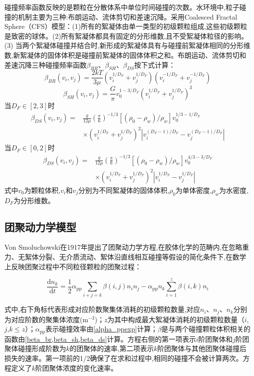 碰撞频率函数反映的是颗粒在分散体系中单位时间碰撞的次数。水环境中,粒子碰撞的机制主要为三种:布朗运动、流体剪切和差速沉降\cite{ThomasJudd-749}。采用Coalesced Fractal Sphere（CFS）模型\cite{LeeBonner-748}：(1)所有的絮凝体由单一类型的初级颗粒组成,这些初级颗粒是致密的球体。(2)所有絮凝体都具有固定的分形维数,且不受絮凝体粒径的影响。(3) 当两个絮凝体碰撞并结合时,新形成的絮凝体具有与碰撞前絮凝体相同的分形维数,新絮凝体的固体体积是碰撞前絮凝体的固体体积之和。布朗运动、流体剪切和差速沉降三种碰撞频率函数$\beta_{BR}$、$\beta_{SH}$、$\beta_{DS}$按下式计算\cite{LeeBonner-748}：
\begin{equation}\label{beta_br}
    \beta_{BR}(v_i,v_j)=\frac{2kT}{3\mu}(v_i^{1/D_F}+v_j^{1/D_F})(v_i^{-1/D_F}+v_j^{-1/D_F})
\end{equation}
\begin{equation}\label{beta_sh}
    \beta_{SH}(v_i,v_j)=\frac{G}{\pi}v_0^{1-3/D_F}{(v_i^{1/D_F}+v_j^{1/D_F})}^3
\end{equation}
当$D_F\in[2,3]$时
\begin{align}\label{beta_ds}
    \beta_{DS}(v_i,v_j)=&\frac{g}{12\mu}{(\frac{\pi}{6})}^{-1/3}[(\rho_0-\rho_w)/\rho_w]v_0^{1/3-1/D_F}\\ & \times(v_i^{1/D_F}+v_j^{1/D_F})^2\left|v_i^{(D_F-1)/D_F}-v_j^{(D_F-1)/D_F}\right| \nonumber
\end{align}
当$D_F\in[0,2]$时
\begin{align}
    \beta_{DS}(v_i,v_j)=&\frac{g}{12\mu}{(\frac{\pi}{6})}^{-1/3}[(\rho_0-\rho_w)/\rho_w]v_0^{4/3-3/D_F}\\ &\times(v_i^{1/D_F}+v_j^{1/D_F})^2\left|v_i^{1/D_F}-v_j^{1/D_F}\right| \nonumber
\end{align}
式中$v_0$为颗粒体积,$v_i$和$v_j$分别为不同絮凝体的固体体积,$\rho_0$为单体密度,$\rho_w$为水密度,$D_F$为分形维数。

\subsection{团聚动力学模型}

Von Smoluchowski在1917年提出了团聚动力学方程\cite{Smoluchowski-752},在胶体化学的范畴内,在忽略重力、无絮体分裂、无介质流动、絮体沿直线相互碰撞等假设的简化条件下,在数学上反映团聚过程中不同粒径颗粒的团聚过程\cite{Smoluchowski-752}：

\begin{equation}\label{smoluchowski}
    \frac{\mathrm{d}n_k}{\mathrm{d}t}=\frac{1}{2}\alpha_\mathrm{pp}\sum_{i+j=k}{\beta(i,j)n_in_j}-\alpha_\mathrm{pp} n_k\sum_{i=1}^{z}{\beta(i,k)n_i}
\end{equation}

式中,右下角标代表形成对应阶数聚集体消耗的初级颗粒数量,对应$n_i$、$n_j$、$n_k$分别为对应阶数的聚集体浓度($\mathrm{m^{-3}}$)；$z$为其中构成最大絮凝体消耗的初级颗粒数量（$i$,$j$,$k\leq z$）；$\alpha_\mathrm{pp}$表示碰撞效率由\cref{alpha_ppexp}计算；$\beta$是与两个碰撞颗粒体积相关的函数由\cref{beta_br,beta_sh,beta_ds}计算。方程右侧的第一项表示$i$阶团聚体和$j$阶团聚体碰撞形成阶数为$k$的团聚体的速率,第二项表示$k$阶团聚体与其他团聚体碰撞后损失的速率。第一项前的1/2确保了在求和过程中,相同的碰撞不会被计算两次。方程定义了$k$阶团聚体浓度的变化速率。
